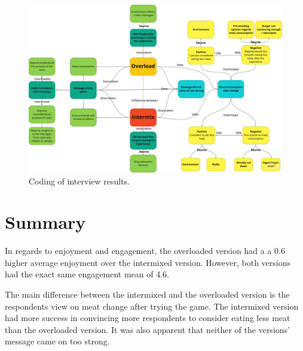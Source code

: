         \begin{figure}[H]
        \centering
        \includegraphics[width=1\linewidth]{figure/Evaluation/eval.jpg}
        \caption{Coding of interview results.}
        \label{fig:EvalCoding}
    \end{figure}
    
\section{Summary}
In regards to enjoyment and engagement, the overloaded version had a a 0.6 higher average enjoyment over the intermixed version. However, both versions had the exact same engagement mean of 4.6.

The main difference between the intermixed and the overloaded version is the respondents view on meat change after trying the game. The intermixed version had more success in convincing more respondents to consider eating less meat than the overloaded version. It was also apparent that neither of the versions' message came on too strong. 